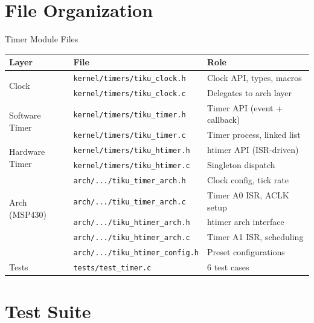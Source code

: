 \documentclass[aspectratio=169, 10pt]{beamer}
\begin{document}
\section{File Organization}

\begin{frame}[fragile]{Timer Module Files}
\begin{table}
\centering
\small
\begin{tabular}{@{}llp{5.5cm}@{}}
\toprule
\textbf{Layer} & \textbf{File} & \textbf{Role} \\
\midrule
\multirow{2}{*}{Clock}
  & \texttt{kernel/timers/tiku\_clock.h} & Clock API, types, macros \\
  & \texttt{kernel/timers/tiku\_clock.c} & Delegates to arch layer \\
\midrule
\multirow{2}{*}{Software Timer}
  & \texttt{kernel/timers/tiku\_timer.h} & Timer API (event + callback) \\
  & \texttt{kernel/timers/tiku\_timer.c} & Timer process, linked list \\
\midrule
\multirow{2}{*}{Hardware Timer}
  & \texttt{kernel/timers/tiku\_htimer.h} & htimer API (ISR-driven) \\
  & \texttt{kernel/timers/tiku\_htimer.c} & Singleton dispatch \\
\midrule
\multirow{4}{*}{Arch (MSP430)}
  & \texttt{arch/.../tiku\_timer\_arch.h}  & Clock config, tick rate \\
  & \texttt{arch/.../tiku\_timer\_arch.c}  & Timer A0 ISR, ACLK setup \\
  & \texttt{arch/.../tiku\_htimer\_arch.h} & htimer arch interface \\
  & \texttt{arch/.../tiku\_htimer\_arch.c} & Timer A1 ISR, scheduling \\
  & \texttt{arch/.../tiku\_htimer\_config.h} & Preset configurations \\
\midrule
Tests
  & \texttt{tests/test\_timer.c} & 6 test cases \\
\bottomrule
\end{tabular}
\end{table}
\end{frame}

\section{Test Suite}
\end{document}
